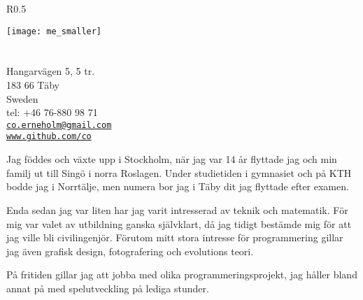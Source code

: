 \documentclass[margin,line]{resume}%
\begin{document}
{\sc \Large {}}%
\begin{resume}
    \vspace{0.5cm}
    \begin{wrapfigure}{R}{0.5\textwidth}
         \vspace{-1cm}
        \begin{center}
        \texttt{[image: me\_smaller]}
        \end{center}
         \vspace{-1cm}
    \end{wrapfigure}

	   \section{}\vspace{0.001mm}
	   Hangarvägen 5, 5 tr.  \\
	   183 66 Täby  \\
	   Sweden \\
	   tel: +46 76-880 98 71\\
	   \href{mailto:co.erneholm@gmail.com}{\texttt{co.erneholm@gmail.com}} \\
	   \href{http://www.github.com/co}{\texttt{www.github.com/co}}

	Jag föddes och växte upp i Stockholm, när jag var 14 år flyttade jag
	och min familj ut till Singö i norra Roslagen. Under studietiden i
	gymnasiet och på KTH bodde jag i Norrtälje, men numera bor jag i Täby dit
	jag flyttade efter examen.

	Enda sedan jag var liten har jag varit intresserad av teknik och
	matematik. För mig var valet av utbildning ganska självklart, då
	jag tidigt bestämde mig för att jag ville bli civilingenjör.
	Förutom mitt stora intresse för programmering gillar jag även grafisk
	design, fotografering och evolutions teori.
	
	På fritiden gillar jag att jobba med olika programmeringsprojekt, jag håller
	bland annat på med spelutveckling på lediga stunder.


\end{resume}
\end{document}
